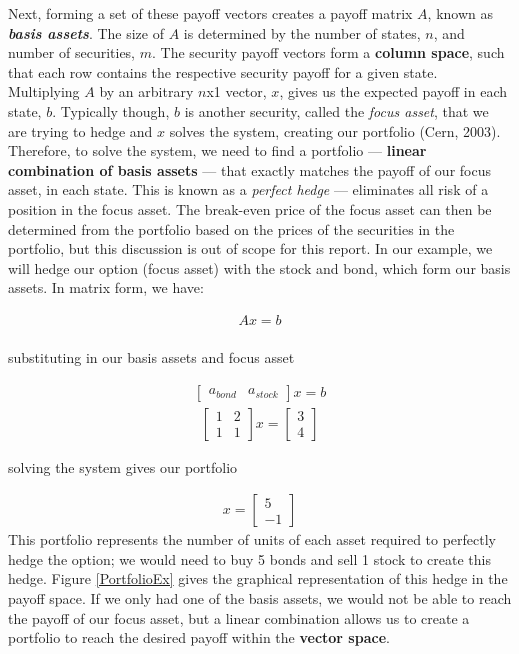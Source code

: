\documentclass[a4paper,11pt]{report}
\begin{document}
\begin{multicols}{2}
\indent
Next, forming a set of these payoff vectors creates a payoff matrix $A$, known as \textbf{\textit{basis assets}}. 
The size of $A$ is determined by the number of states, $n$, and number of securities, $m$. 
The security payoff vectors form a \textbf{column space}, such that each row contains the respective security payoff for a given state. 
Multiplying $A$ by an arbitrary $n$x1 vector, $x$, gives us the expected payoff in each state, $b$. Typically though, $b$ is another security, called the \textit{focus asset}, that we are trying to hedge and $x$ solves the system, creating our portfolio (Cern, 2003). 
Therefore, to solve the system, we need to find a portfolio --- \textbf{linear combination of basis assets} --- that exactly matches the payoff of our focus asset, in each state. 
This is known as a \textit{perfect hedge} --- eliminates all risk of a position in the focus asset. 
The break-even price of the focus asset can then be determined from the portfolio based on the prices of the securities in the portfolio, but this discussion is out of scope for this report. 
In our example, we will hedge our option (focus asset) with the stock and bond, which form our basis assets. In matrix form, we have:

\begin{align*}
	Ax = b \\
\end{align*}

substituting in our basis assets and focus asset

\begin{align*}
	\left[\begin{array}{cc}
		a_{bond} & a_{stock}
	\end{array}\right]x=b
\end{align*}
\begin{align*}
	\left[\begin{array}{cc}
		1 & 2\\ 
		1 & 1
	\end{array}\right]x = \left[\begin{array}{c}3\\ 4\end{array}\right]
\end{align*}

solving the system gives our portfolio

\begin{align*}
	x = \left[\begin{array}{c}5\\ -1\end{array}\right]
\end{align*}
This portfolio represents the number of units of each asset required to perfectly hedge the option; we would need to buy 5 bonds and sell 1 stock to create this hedge. Figure \ref{PortfolioEx} gives the graphical representation of this hedge in the payoff space. If we only had one of the basis assets, we would not be able to reach the payoff of our focus asset, but a linear combination allows us to create a portfolio to reach the desired payoff within the \textbf{vector space}.



\end{multicols}
\end{document}
